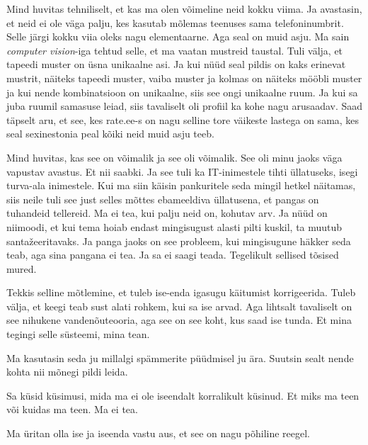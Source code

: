 Mind huvitas tehniliselt, et kas ma olen võimeline neid kokku viima. Ja avastasin, et neid ei ole väga palju, kes kasutab mõlemas teenuses sama telefoninumbrit. Selle järgi kokku viia oleks nagu elementaarne. Aga seal on muid asju. Ma sain \emph{computer vision}-iga tehtud selle, et ma vaatan mustreid taustal. Tuli välja, et tapeedi muster on üsna unikaalne asi. Ja kui nüüd seal pildis on kaks erinevat mustrit, näiteks tapeedi muster, vaiba muster ja kolmas on näiteks  mööbli muster ja kui nende kombinatsioon on unikaalne, siis see ongi unikaalne ruum. Ja kui sa juba ruumil samasuse leiad, siis tavaliselt oli profiil ka kohe nagu arusaadav. Saad täpselt aru, et see, kes rate.ee-s  on nagu selline tore väikeste lastega on sama, kes seal sexinestonia peal kõiki neid muid asju teeb. 


Mind huvitas, kas see on võimalik ja see oli võimalik. See oli minu jaoks väga vapustav avastus. Et nii saabki. Ja see tuli ka IT-inimestele tihti üllatuseks, isegi turva-ala inimestele. Kui ma siin käisin  pankuritele seda mingil hetkel näitamas, siis neile tuli see just selles mõttes ebameeldiva üllatusena, et pangas on tuhandeid tellereid. Ma ei tea, kui palju neid on, kohutav arv. Ja nüüd on niimoodi, et kui tema hoiab endast mingisugust alasti pilti kuskil, ta muutub santažeeritavaks. Ja panga jaoks on see probleem, kui mingisugune häkker seda teab, aga sina pangana ei tea. Ja sa ei saagi  teada. Tegelikult sellised tõsised mured. 

Tekkis selline mõtlemine, et tuleb ise-enda igasugu käitumist korrigeerida. Tuleb välja, et keegi teab sust alati rohkem, kui sa ise arvad. Aga lihtsalt tavaliselt on see nihukene vandenõuteooria, aga see on see koht, kus saad ise tunda. Et mina tegingi selle süsteemi, mina tean. 

Ma kasutasin seda ju millalgi spämmerite püüdmisel ju ära. Suutsin sealt nende kohta nii mõnegi pildi leida.


Sa küsid küsimusi, mida ma ei ole iseendalt korralikult küsinud. Et miks ma teen või kuidas ma teen. Ma ei tea. 


Ma üritan olla ise ja iseenda vastu aus, et see on nagu põhiline reegel. 
